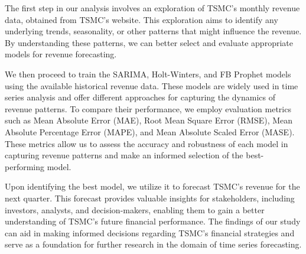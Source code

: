\documentclass[
]{article}
\begin{document}
The first step in our analysis involves an exploration of TSMC's monthly
revenue data, obtained from TSMC's website. This exploration aims to
identify any underlying trends, seasonality, or other patterns that
might influence the revenue. By understanding these patterns, we can
better select and evaluate appropriate models for revenue forecasting.

We then proceed to train the SARIMA, Holt-Winters, and FB Prophet models
using the available historical revenue data. These models are widely
used in time series analysis and offer different approaches for
capturing the dynamics of revenue patterns. To compare their
performance, we employ evaluation metrics such as Mean Absolute Error
(MAE), Root Mean Square Error (RMSE), Mean Absolute Percentage Error
(MAPE), and Mean Absolute Scaled Error (MASE). These metrics allow us to
assess the accuracy and robustness of each model in capturing revenue
patterns and make an informed selection of the best-performing model.

Upon identifying the best model, we utilize it to forecast TSMC's
revenue for the next quarter. This forecast provides valuable insights
for stakeholders, including investors, analysts, and decision-makers,
enabling them to gain a better understanding of TSMC's future financial
performance. The findings of our study can aid in making informed
decisions regarding TSMC's financial strategies and serve as a
foundation for further research in the domain of time series
forecasting.
\end{document}
